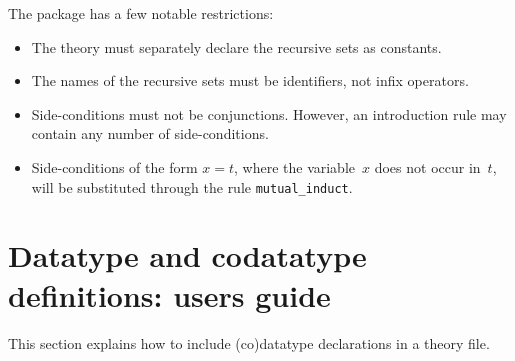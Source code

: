 The package has a few notable restrictions:
\begin{itemize}
\item The theory must separately declare the recursive sets as
  constants.

\item The names of the recursive sets must be identifiers, not infix
operators.  

\item Side-conditions must not be conjunctions.  However, an introduction rule
may contain any number of side-conditions.

\item Side-conditions of the form $x=t$, where the variable~$x$ does not
  occur in~$t$, will be substituted through the rule \verb|mutual_induct|.
\end{itemize}


\section{Datatype and codatatype definitions: users guide}
This section explains how to include (co)datatype declarations in a theory
file.  


